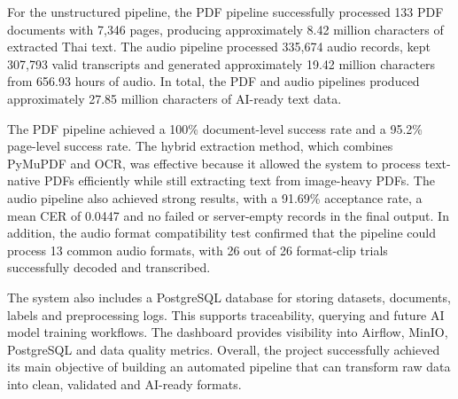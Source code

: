 \documentclass[12pt,oneside,openright,a4paper]{cpe-english-project}
\begin{document}
For the unstructured pipeline, the PDF pipeline successfully processed 133 PDF documents with 7{,}346 pages, producing approximately 8.42 million characters of extracted Thai text. The audio pipeline processed 335{,}674 audio records, kept 307{,}793 valid transcripts and generated approximately 19.42 million characters from 656.93 hours of audio. In total, the PDF and audio pipelines produced approximately 27.85 million characters of AI-ready text data.

The PDF pipeline achieved a 100\% document-level success rate and a 95.2\% page-level success rate. The hybrid extraction method, which combines PyMuPDF and OCR, was effective because it allowed the system to process text-native PDFs efficiently while still extracting text from image-heavy PDFs. The audio pipeline also achieved strong results, with a 91.69\% acceptance rate, a mean CER of 0.0447 and no failed or server-empty records in the final output. In addition, the audio format compatibility test confirmed that the pipeline could process 13 common audio formats, with 26 out of 26 format-clip trials successfully decoded and transcribed.

The system also includes a PostgreSQL database for storing datasets, documents, labels and preprocessing logs. This supports traceability, querying and future AI model training workflows. The dashboard provides visibility into Airflow, MinIO, PostgreSQL and data quality metrics. Overall, the project successfully achieved its main objective of building an automated pipeline that can transform raw data into clean, validated and AI-ready formats.
\end{document}
